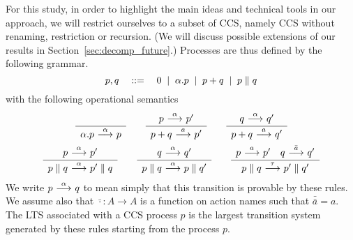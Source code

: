 For this study, 
in order to highlight the main ideas and technical tools in our approach,
we will restrict ourselves to a subset of CCS, namely CCS without
renaming, restriction or recursion. 
(We will discuss possible extensions of our results in 
Section~\ref{sec:decomp_future}.)
Processes are thus defined by the following
grammar.
\[
    p,q \quad::=\quad 0 \;\;|\;\; \alpha.p \;\;|\;\; p + q \;\;|\;\; p \parallel q
\]
with the following operational semantics
\begin{gather*}
    \sosrule{}{\alpha.p \trans{\alpha} p} \qquad
    \sosrule{p\trans{\alpha}p'}{p + q \trans{a} p'} \qquad
    \sosrule{q\trans{\alpha}q'}{p + q \trans{a} q'} \\
    \sosrule{p\trans{\alpha}p'}{p \parallel q \trans{\alpha} p' \parallel q} \qquad
    \sosrule{q\trans{\alpha}q'}{p \parallel q \trans{\alpha} p \parallel q'} \qquad
    \sosrule{p\trans{a}p'\quad q\trans{\bar{a}}q'}{p \parallel q \trans{\tau} p' \parallel q'}
\end{gather*}
We write $p\ {\stackrel{{\alpha}}{\longrightarrow}}\ q$ to mean simply that this transition is provable by
these rules. We assume also that $\bar{\cdot} : A\rightarrow A$ is a function on action names
such that $\bar{\bar{a}} = a$.
The LTS associated with a CCS process $p$ is the largest transition system 
generated by these
rules starting from the process $p$. 

